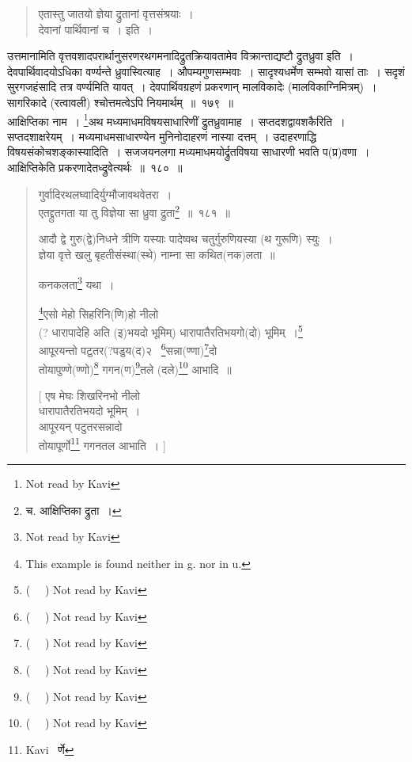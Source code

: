 \documentclass[11pt, openany]{book}
\begin{document}
\begin{quote}
{\qt एतास्तु जातयो ज्ञेया द्रुतानां वृत्तसंश्रयाः~।\\
देवानां पार्थिवानां च~।} इति~। 
\end{quote}

\noindent
उत्तमानामिति वृत्तवशादपरार्थानुसरणरथगमनादिद्रुतक्रियावतामेव विक्रान्ताद्यष्टौ द्रुतध्रुवा इति~। देवपार्थिवादयोऽधिका वर्ण्यन्ते ध्रुवास्वित्याह~। {\qtt औपम्यगुणसम्भवाः}~। सादृश्यधर्मेण सम्भवो यासां ताः~। सदृशं सुरगजहंसादि तत्र वर्ण्यमिति यावत्~। {\qtt देवपार्थिवग्रहणं} प्रकरणान् {\qtt मालविकादेः (मालविकाग्निमित्रम्)~। सागरिकादे (रत्वावली)} श्चोत्तमत्वेऽपि नियमार्थम्~॥~१७९~॥\\

आक्षिप्तिका नाम~। \renewcommand{\thefootnote}{1}\footnote{Not read by Kavi}अथ मध्यमाधमविषयसाधारिणीं द्रुतध्रुवामाह~। {\qtt सप्तदशद्वावशकैरिति}~। {\qtt सप्तदशा}क्षरेयम्~। मध्यमाधमसाधारण्येन {\qtt मुनिनोदा}हरणं नास्या दत्तम्~। उदाहरणाद्धि विषयसंकोचशङ्कास्यादिति~। सजजयनलगा मध्यमाधमयोर्द्रुतविषया साधारणी भवति प(प्र)वणा~। {\qtt आक्षिप्तिकेति} प्रकरणादेतध्द्रुवेत्यर्थः~॥~१८०~॥

\newpage

\begin{quote}
{\na गुर्वादिरथलघ्वादिर्युग्मौजावथवेतरा~।\\
एतद्द्रुतगता या तु विज्ञेया सा ध्रुवा द्रुता\renewcommand{\thefootnote}{1}\footnote{च. आक्षिप्तिका द्रुता~।}~॥~१८१~॥}

{\qt आदौ द्वे गुरु(द्वे)निधने त्रीणि यस्याः पादेष्वथ चतुर्गुरुणियस्या (थ गुरूणि) स्युः~।\\
ज्ञेया वृत्ते खलु बृहतीसंस्था(स्थे) नाम्ना सा कथित(नक)लता~॥}

कनकलता\renewcommand{\thefootnote}{2}\footnote{Not read by Kavi} यथा~।

{\qt \renewcommand{\thefootnote}{3}\footnote{This example is found neither in g. nor in u.}एसो मेहो सिहरिनि(णि)हो नीलो \\
(? धारापादेहि अति (इ)भयदो भूमिम्) धारापातैरतिभयगो(दो) भूमिम्~।\renewcommand{\thefootnote}{4}\footnote{( \textendash\ \textendash\ \textendash ) Not read by Kavi}\\
आपूरयन्तो पटुतर(?पडुय(द)२ \textendash\ \renewcommand{\thefootnote}{5}\footnote{( \textendash\ \textendash\ \textendash ) Not read by Kavi}सन्ना(ण्णा)\renewcommand{\thefootnote}{6}\footnote{( \textendash\ \textendash\ \textendash ) Not read by Kavi}दो\\
तोयापुण्णे(ण्णो)\renewcommand{\thefootnote}{7}\footnote{( \textendash\ \textendash\ \textendash ) Not read by Kavi} गगन(ण)\renewcommand{\thefootnote}{8}\footnote{( \textendash\ \textendash\ \textendash ) Not read by Kavi}तले (दले)\renewcommand{\thefootnote}{9}\footnote{( \textendash\ \textendash\ \textendash ) Not read by Kavi} आभादि~॥

[ एष मेघः शिखरिनभो नीलो \\
धारापातैरतिभयदो भूमिम्~। \\
आपूरयन् पटुतरसन्नादो \\
तोयापूर्णो\renewcommand{\thefootnote}{10}\footnote{Kavi \textendash\ र्णे} गगनतल आभाति~। ] }
\end{quote}
\end{document}
